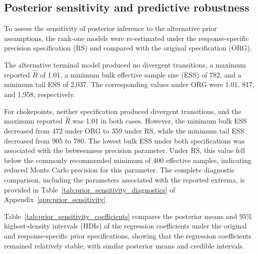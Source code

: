\documentclass[pdftex,12pt,openright,a4paper,oneside]{book}
\begin{document}
\subsection{Posterior sensitivity and predictive robustness}
\label{subsec:posterior_sensitivity}

To assess the sensitivity of posterior inference to the alternative prior assumptions, 
the rank-one models were re-estimated under the response-specific precision specification (RS) 
and compared with the original specification (ORG).

The alternative terminal model produced no divergent transitions, a maximum reported $\widehat{R}$ of 1.01, a minimum bulk effective sample size (ESS) of 782, and a minimum tail ESS of 2,037. The corresponding values under ORG were 1.01, 817, and 1,958, respectively.

For chokepoints, neither specification produced divergent transitions, and the maximum reported $\widehat{R}$ was 1.01 in both cases. However, the minimum bulk ESS decreased from 472 under ORG to 359 under RS, while the minimum tail ESS decreased from 905 to 780. 
The lowest bulk ESS under both specifications was associated with the betweenness precision parameter. Under RS, this value fell below the commonly recommended minimum of 400 effective samples, indicating reduced Monte Carlo precision for this parameter.
The complete diagnostic comparison, including the parameters associated with the reported extrema, is provided in Table~\ref{tab:prior_sensitivity_diagnostics} of Appendix~\ref{app:prior_sensitivity}.

Table~\ref{tab:prior_sensitivity_coefficients}
compares the posterior means and 95\% highest-density
intervals (HDIs) of the regression coefficients
under the original and response-specific prior specifications, showing that the regression coefficients remained relatively stable, with similar posterior
means and credible intervals.
\end{document}
